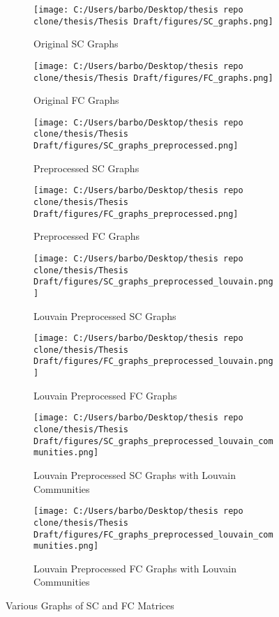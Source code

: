 \begin{figure}[h!]
    \centering
    \begin{subfigure}[b]{0.45\textwidth}
        \texttt{[image: C:/Users/barbo/Desktop/thesis repo clone/thesis/Thesis Draft/figures/SC\_graphs.png]}
        \caption{Original SC Graphs}
    \end{subfigure}
    \begin{subfigure}[b]{0.45\textwidth}
        \texttt{[image: C:/Users/barbo/Desktop/thesis repo clone/thesis/Thesis Draft/figures/FC\_graphs.png]}
        \caption{Original FC Graphs}
    \end{subfigure}
    
    \begin{subfigure}[b]{0.45\textwidth}
        \texttt{[image: C:/Users/barbo/Desktop/thesis repo clone/thesis/Thesis Draft/figures/SC\_graphs\_preprocessed.png]}
        \caption{Preprocessed SC Graphs}
    \end{subfigure}
    \begin{subfigure}[b]{0.45\textwidth}
        \texttt{[image: C:/Users/barbo/Desktop/thesis repo clone/thesis/Thesis Draft/figures/FC\_graphs\_preprocessed.png]}
        \caption{Preprocessed FC Graphs}
    \end{subfigure}
    
    \begin{subfigure}[b]{0.45\textwidth}
        \texttt{[image: C:/Users/barbo/Desktop/thesis repo clone/thesis/Thesis Draft/figures/SC\_graphs\_preprocessed\_louvain.png]}
        \caption{Louvain Preprocessed SC Graphs}
    \end{subfigure}
    \begin{subfigure}[b]{0.45\textwidth}
        \texttt{[image: C:/Users/barbo/Desktop/thesis repo clone/thesis/Thesis Draft/figures/FC\_graphs\_preprocessed\_louvain.png]}
        \caption{Louvain Preprocessed FC Graphs}
    \end{subfigure}
    
    \begin{subfigure}[b]{0.45\textwidth}
        \texttt{[image: C:/Users/barbo/Desktop/thesis repo clone/thesis/Thesis Draft/figures/SC\_graphs\_preprocessed\_louvain\_communities.png]}
        \caption{Louvain Preprocessed SC Graphs with Louvain Communities}
    \end{subfigure}
    \begin{subfigure}[b]{0.45\textwidth}
        \texttt{[image: C:/Users/barbo/Desktop/thesis repo clone/thesis/Thesis Draft/figures/FC\_graphs\_preprocessed\_louvain\_communities.png]}
        \caption{Louvain Preprocessed FC Graphs with Louvain Communities}
    \end{subfigure}
    
    \caption{Various Graphs of SC and FC Matrices}
\end{figure}






